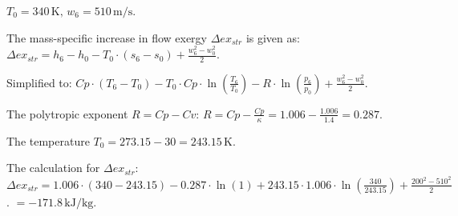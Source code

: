 \( T_0 = 340 \, \text{K}, \, w_6 = 510 \, \text{m/s} \).  

The mass-specific increase in flow exergy \( \Delta ex_{str} \) is given as:  
\( \Delta ex_{str} = h_6 - h_0 - T_0 \cdot (s_6 - s_0) + \frac{w_6^2 - w_0^2}{2} \).  

Simplified to:  
\( Cp \cdot (T_6 - T_0) - T_0 \cdot Cp \cdot \ln\left(\frac{T_6}{T_0}\right) - R \cdot \ln\left(\frac{p_6}{p_0}\right) + \frac{w_6^2 - w_0^2}{2} \).  

The polytropic exponent \( R = Cp - Cv \):  
\( R = Cp - \frac{Cp}{\kappa} = 1.006 - \frac{1.006}{1.4} = 0.287 \).  

The temperature \( T_0 = 273.15 - 30 = 243.15 \, \text{K} \).  

The calculation for \( \Delta ex_{str} \):  
\( \Delta ex_{str} = 1.006 \cdot (340 - 243.15) - 0.287 \cdot \ln(1) + 243.15 \cdot 1.006 \cdot \ln\left(\frac{340}{243.15}\right) + \frac{200^2 - 510^2}{2} \).  
\( = -171.8 \, \text{kJ/kg} \).